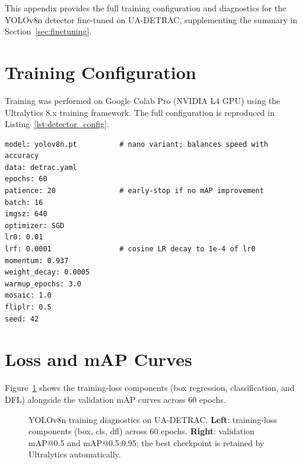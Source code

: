 \documentclass[12pt,a4paper]{report}
\begin{document}
This appendix provides the full training configuration and diagnostics
for the YOLOv8n detector fine-tuned on UA-DETRAC, supplementing the
summary in Section~\ref{sec:finetuning}.

\section{Training Configuration}

Training was performed on Google Colab Pro (NVIDIA L4 GPU) using the
Ultralytics 8.x training framework.  The full configuration is
reproduced in Listing~\ref{lst:detector_config}.

\begin{lstlisting}[language={},
  caption={YOLOv8n fine-tuning configuration (\texttt{configs/detector\_train.yaml}).},
  label=lst:detector_config]
model: yolov8n.pt          # nano variant; balances speed with accuracy
data: detrac.yaml
epochs: 60
patience: 20               # early-stop if no mAP improvement
batch: 16
imgsz: 640
optimizer: SGD
lr0: 0.01
lrf: 0.0001                # cosine LR decay to 1e-4 of lr0
momentum: 0.937
weight_decay: 0.0005
warmup_epochs: 3.0
mosaic: 1.0
fliplr: 0.5
seed: 42
\end{lstlisting}

\section{Loss and mAP Curves}

Figure~\ref{fig:detector_curves} shows the training-loss components
(box regression, classification, and DFL) alongside the validation
mAP curves across 60 epochs.

\begin{figure}[htbp]
  \centering
  \caption{YOLOv8n training diagnostics on UA-DETRAC.
           \textbf{Left}: training-loss components (box, cls, dfl) across
           60 epochs.
           \textbf{Right}: validation mAP@0.5 and mAP@0.5:0.95; the
           best checkpoint is retained by Ultralytics automatically.}
  \label{fig:detector_curves}
\end{figure}
\end{document}
